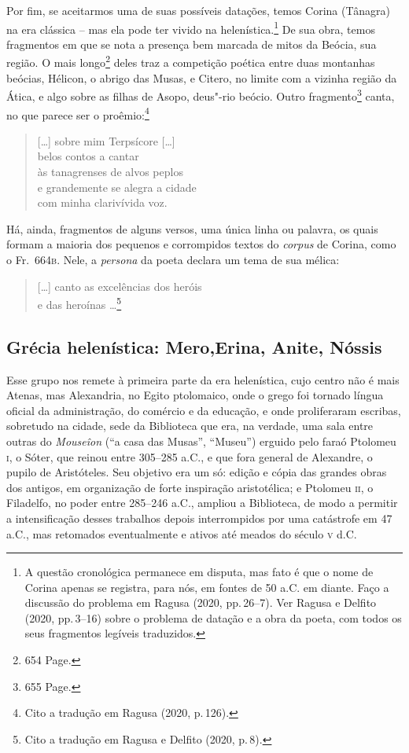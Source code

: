 Por fim, se aceitarmos uma de suas possíveis datações, temos Corina (Tânagra) na
era clássica -- mas ela pode ter vivido na helenística.\footnote{A questão cronológica permanece em disputa, mas fato é que o nome de Corina apenas se registra, para nós, em
fontes de 50 a.C. em diante. Faço a discussão do problema em Ragusa (2020, pp.\,26--7). Ver Ragusa e Delfito (2020, pp.\,3--16) sobre o problema de datação e a obra da poeta, com todos os seus fragmentos legíveis traduzidos.} De sua obra, temos
fragmentos em que se nota a presença bem marcada de mitos da Beócia, sua região.
O mais longo\footnote{654 Page.} deles traz a competição poética entre duas montanhas beócias,
Hélicon, o abrigo das Musas, e Citero, no limite com a vizinha região da Ática,
e algo sobre as filhas de Asopo, deus"-rio beócio. Outro fragmento\footnote{655 Page.}
canta, no que parece ser o proêmio:\footnote{Cito a tradução em Ragusa (2020, p.\,126).}

\begin{verse}
\small{[\ldots{}] sobre mim Terpsícore [\ldots{}]\\
belos contos a cantar\\
às tanagrenses de alvos peplos\\
e grandemente se alegra a cidade\\
com minha clarivívida voz.}
\end{verse}

Há, ainda, fragmentos de alguns versos, uma única linha ou palavra, os quais
formam a maioria dos pequenos e corrompidos textos do \textit{corpus} de
Corina, como o Fr.~664\textsc{b}. Nele, a \textit{persona} da poeta declara um
tema de sua mélica:

\begin{verse}
\small{[\ldots{}] canto as excelências dos heróis\\
e das heroínas \ldots{}}\footnote{Cito a tradução em Ragusa e Delfito (2020, p.\,8).}
\end{verse}

\subsection*{Grécia helenística: Mero,\break Erina, Anite, Nóssis}

Esse grupo nos remete à primeira parte da era helenística, cujo centro não é
mais Atenas, mas Alexandria, no Egito ptolomaico, onde o grego foi tornado
língua oficial da administração, do comércio e da educação, e onde proliferaram
escribas, sobretudo na cidade, sede da Biblioteca que era, na
verdade, uma sala entre outras do \textit{Mouseîon} (“a casa das Musas”,
“Museu”) erguido pelo faraó Ptolomeu \textsc{i}, o Sóter, que reinou entre 305--285 a.C.,
e que fora general de Alexandre, o pupilo de Aristóteles. Seu objetivo era um
só: edição e cópia das grandes obras dos antigos, em organização de forte
inspiração aristotélica; e Ptolomeu \textsc{ii}, o Filadelfo, no poder entre 285--246
a.C., ampliou a Biblioteca, de modo a permitir a intensificação desses
trabalhos depois interrompidos por uma catástrofe em 47 a.C., mas retomados
eventualmente e ativos até meados do século \textsc{v} d.C. 


